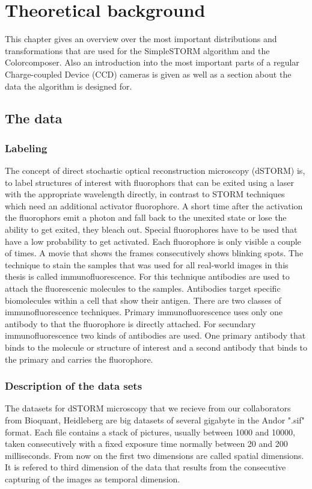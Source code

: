 \chapter{Theoretical background}
This chapter gives an overview over the most important distributions and transformations that are used for the SimpleSTORM algorithm and the Colorcomposer. Also an introduction into the most important parts of a regular Charge-coupled Device (CCD) cameras is given as well as a section about the data the algorithm is designed for. 

\section{The data}
\subsection{Labeling}
The concept of direct stochastic optical reconstruction microscopy (dSTORM) \cite{heilemann} is, to label structures of interest with fluorophors that can be exited using a laser with the appropriate wavelength directly, in contrast to STORM techniques which need an additional activator fluorophore. A short time after the activation the fluorophors emit a photon and fall back to the unexited state or lose the ability to get exited, they bleach out. Special fluorophores have to be used that have a low probability to get activated. Each fluorophore is only visible a couple of times. A movie that shows the frames consecutively shows blinking spots.\newline
The technique to stain the samples that was used for all real-world images in this thesis is called immunofluorescence. For this technique antibodies are used to attach the fluorescenic molecules to the samples. Antibodies target specific biomolecules within a cell that show their antigen. There are two classes of immunofluorescence techniques.\newline
Primary immunofluorescence uses only one antibody to that the fluorophore is directly attached.\newline
For secundary immunofluorescence two kinds of antibodies are used. One primary antibody that binds to the molecule or structure of interest and a second antibody that binds to the primary and carries the fluorophore.

\subsection{Description of the data sets}
The datasets for dSTORM microscopy that we recieve from our collaborators from
Bioquant, Heidleberg are big datasets of several gigabyte in the Andor ".sif" format. Each
file contains a stack of pictures, usually between 1000 and 10000, taken
consecutively with a fixed exposure time normally between 20 and 200 milliseconds. From now on the first two dimensions are called spatial dimensions. It is refered to third dimension of the data that results from the consecutive capturing of the images as temporal dimension.\newline

